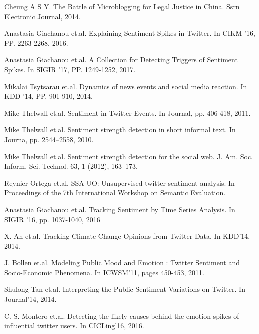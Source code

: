 \documentclass[runningheads]{llncs}
\begin{document}
\begin{thebibliography}{8}

Cheung A S Y. 
\newblock The Battle of Microblogging for Legal Justice in China. 
\newblock Ssrn Electronic Journal, 2014.

Anastasia Giachanou et.al.
\newblock  Explaining Sentiment Spikes in Twitter.
\newblock In CIKM ’16, PP. 2263-2268, 2016.

Anastasia Giachanou et.al.
\newblock  A Collection for Detecting Triggers of Sentiment Spikes.
\newblock In SIGIR ’17, PP. 1249-1252, 2017.

Mikalai Tsytsarau et.al.
\newblock  Dynamics of news events and social media reaction.
\newblock In KDD ’14, PP. 901-910, 2014.

Mike Thelwall et.al.
\newblock Sentiment in Twitter Events.
\newblock In Journal, pp. 406-418, 2011.

Mike Thelwall et.al.
\newblock Sentiment strength detection in short informal text.
\newblock In Journa, pp. 2544–2558, 2010.

Mike Thelwall et.al.
\newblock Sentiment strength detection for the social web.
\newblock J. Am. Soc. Inform. Sci. Technol. 63, 1 (2012), 163–173.

Reynier Ortega et.al.
\newblock SSA-UO: Unsupervised twitter sentiment analysis.
\newblock In Proceedings of the 7th International Workshop on Semantic Evaluation.

Anastasia Giachanou et.al.
\newblock Tracking Sentiment by Time Series Analysis.
\newblock In SIGIR ’16, pp. 1037-1040, 2016

X. An et.al.
\newblock Tracking Climate Change Opinions from Twitter Data. 
\newblock In KDD’14, 2014.

J. Bollen et.al.
\newblock Modeling Public Mood and Emotion : Twitter Sentiment and Socio-Economic Phenomena. 
\newblock In ICWSM’11, pages 450-453, 2011.

Shulong Tan et.al.
\newblock Interpreting the Public Sentiment Variations on Twitter. 
\newblock In Journal’14, 2014.

C. S. Montero et.al.
\newblock Detecting the likely causes behind the emotion spikes of influential twitter users. 
\newblock In CICLing’16, 2016.


\end{thebibliography}
\end{document}

